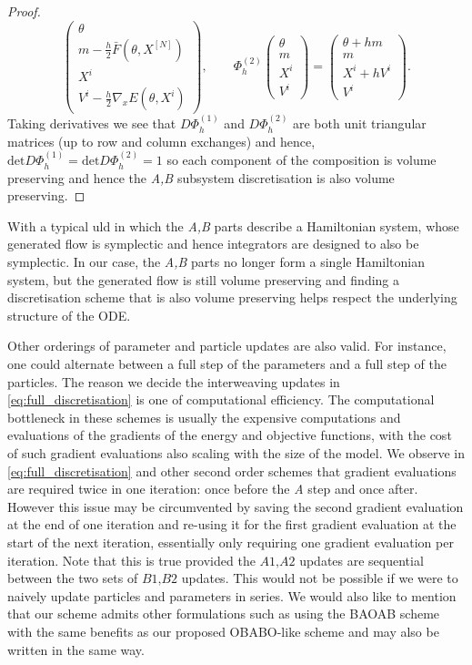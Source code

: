 \begin{proof}
\begin{equation*}
\begin{pmatrix}
        \theta \\
        m-\frac{h}{2}\bar{F}\left(\theta, X^{[N]}\right) \\
        X^i \\
        V^i-\frac{h}{2}\nabla_xE(\theta, X^i)
    \end{pmatrix},\qquad \Phi_h^{(2)}\begin{pmatrix}\theta\\m\\X^i\\V^i
        \end{pmatrix}=\begin{pmatrix}
            \theta + hm \\
            m \\
            X^i + hV^i \\
            V^i
        \end{pmatrix}.
\end{equation*}
Taking derivatives we see that $D\Phi_h^{(1)}$ and $D\Phi_h^{(2)}$ are both unit triangular matrices (up to row and column exchanges) and hence, $\mathrm{det}D\Phi_h^{(1)}=\mathrm{det}D\Phi_h^{(2)}=1$ so each component of the composition is volume preserving and hence the \textit{A,B} subsystem discretisation is also volume preserving.
\end{proof}

With a typical \gls*{uld} in which the \textit{A,B} parts describe a Hamiltonian system, whose generated flow is symplectic and hence integrators are designed to also be symplectic. In our case, the \textit{A,B} parts no longer form a single Hamiltonian system, but the generated flow is still volume preserving and finding a discretisation scheme that is also volume preserving helps respect the underlying structure of the ODE.

Other orderings of parameter and particle updates are also valid. For instance, one could alternate between a full step of the parameters and a full step of the particles. The reason we decide the interweaving updates in \eqref{eq:full_discretisation} is one of computational efficiency. The computational bottleneck in these schemes is usually the expensive computations and evaluations of the gradients of the energy and objective functions, with the cost of such gradient evaluations also scaling with the size of the model. We observe in \eqref{eq:full_discretisation} and other second order schemes that gradient evaluations are required twice in one iteration: once before the \textit{A} step and once after. However this issue may be circumvented by saving the second gradient evaluation at the end of one iteration and re-using it for the first gradient evaluation at the start of the next iteration, essentially only requiring one gradient evaluation per iteration. Note that this is true provided the $\textit{A1,A2}$ updates are sequential between the two sets of $\textit{B1,B2}$ updates. This would not be possible if we were to naively update particles and parameters in series. We would also like to mention that our scheme admits other formulations such as using the BAOAB scheme with the same benefits as our proposed OBABO-like scheme and may also be written in the same way.

